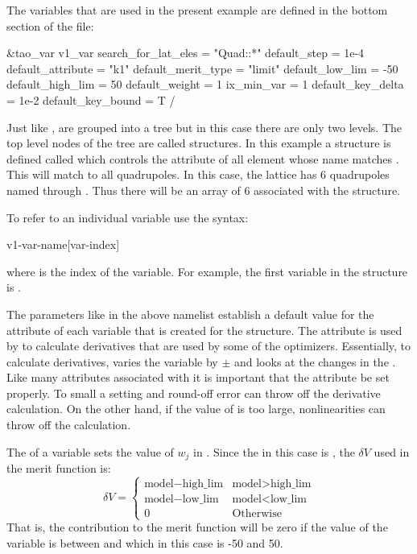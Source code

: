 \documentclass{hitec}     %
\begin{document}
{The variables that are used in the present example are defined in the bottom section of the
 file:
\begin{code}
&tao_var
  v1_var%
  search_for_lat_eles = "Quad::*"
  default_step = 1e-4
  default_attribute = "k1"
  default_merit_type = "limit"
  default_low_lim = -50
  default_high_lim = 50
  default_weight = 1
  ix_min_var = 1
  default_key_delta = 1e-2
  default_key_bound = T
/
\end{code}
Just like ,  are grouped into a tree but in this case there are only two
levels.  The top level nodes of the tree are called  structures. In this example a
 structure is defined called  which controls the  attribute of all
element whose name matches . This will match to all quadrupoles. In this case, the
lattice has 6 quadrupoles named  through . Thus there will be an array of 6
 associated with the   structure.

To refer to an individual variable use the syntax:
\begin{code}
v1-var-name[var-index]
\end{code}
where  is the index of the variable. For example, the first variable in the 
structure is .

The parameters like  in the above namelist establish a default value for the
 attribute of each variable that is created for the  structure. The 
attribute is used by \tao to calculate derivatives that are used by some of the optimizers.
Essentially, to calculate derivatives, \tao varies the variable by $\pm$ and looks at the
changes in the . Like many attributes associated with  it is important
that the  attribute be set properly. To small a setting and round-off error can throw off
the derivative calculation. On the other hand, if the value of  is too large,
nonlinearities can throw off the calculation.

The  of a variable sets the value of $w_j$ in . Since the  in this case
is , the $\delta V$ used in the merit function is:
\begin{equation}
  \delta V = 
    \begin{cases}
    \mbox{model} - \mbox{high\_lim}  & \mbox{model} > \mbox{high\_lim} \\
    \mbox{model} - \mbox{low\_lim}   & \mbox{model} < \mbox{low\_lim} \\
    0                                & \mbox{Otherwise}
    \end{cases}
\end{equation}
That is, the contribution to the merit function will be zero if the value of the variable is between
 and  which in this case is -50 and 50.

}
\end{document}
